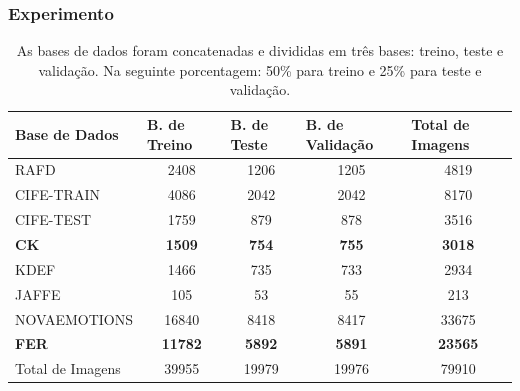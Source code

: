 \documentclass{beamer}
\begin{document}
\begin{frame}
\frametitle{Experimento}
\begin{table}
\tiny
\centering
\caption{As bases de dados foram concatenadas e divididas em três bases: treino, teste e validação. Na seguinte porcentagem: 50\% para treino e 25\% para teste e validação. }
\label{table:basesdivisao}
\begin{tabular}{lcccc}
\hline
\textbf{Base de Dados} & \multicolumn{1}{l}{\textbf{B. de Treino}} & \multicolumn{1}{l}{\textbf{B. de Teste}} & \multicolumn{1}{l}{\textbf{B. de Validação}} & \multicolumn{1}{l}{\textbf{Total de Imagens}} \\ \hline
RAFD                   & 2408                                        & 1206                                       & 1205                                           & 4819                                          \\
CIFE-TRAIN             & 4086                                        & 2042                                       & 2042                                           & 8170                                          \\
CIFE-TEST              & 1759                                        & 879                                        & 878                                            & 3516                                          \\
\textbf{CK}                     & \textbf{1509}                                        & \textbf{754}                                        & \textbf{755}                                            & \textbf{3018}                                          \\
KDEF                   & 1466                                        & 735                                        & 733                                            & 2934                                          \\
JAFFE                  & 105                                         & 53                                         & 55                                             & 213                                           \\
NOVAEMOTIONS           & 16840                                       & 8418                                       & 8417                                           & 33675                                         \\
\textbf{FER}                    & \textbf{11782}                                       & \textbf{5892}                                       & \textbf{5891}                                           & \textbf{23565}                                         \\
Total de Imagens       & 39955                                       & 19979                                      & 19976                                          & 79910                                         \\ \hline
\end{tabular}
\end{table}
\end{frame}
\end{document}
